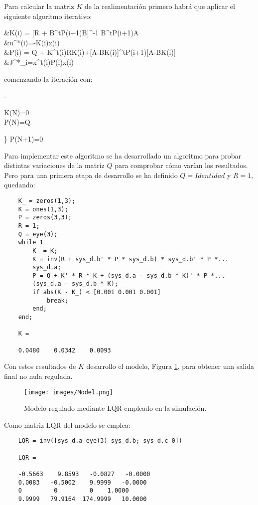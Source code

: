 \documentclass[a4paper, fontsize=11pt]{scrartcl} %
\numberwithin{equation}{section} %
\numberwithin{figure}{section} %
\numberwithin{table}{section} %
\newenvironment{myalign}{\par\nobreak\large\noindent\align}{\endalign} %
\begin{document}
	Para calcular la matriz $K$ de la realimentación primero habrá que aplicar el siguiente algoritmo iterativo:
	
	\begin{myalign}
		\begin{split}
			&K(i) = [R + B^tP(i+1)B]^{-1} B^tP(i+1)A\\
			&u^*(i)=-K(i)x(i)\\
			&P(i) = Q + K^t(i)RK(i)+[A-BK(i)]^tP(i+1)[A-BK(i)]\\
			&J^*_i=x^t(i)P(i)x(i)
		\end{split}	
	\end{myalign}
	comenzando la iteración con:
	
	\begin{myalign}
		\left . 
		\begin{matrix} 
			K(N)=0 \\
			P(N)=Q
		\end{matrix}
		\right \}
		\Longleftrightarrow P(N+1)=0
	\end{myalign}
	
	Para implementar este algoritmo se ha desarrollado un algoritmo para probar distintas variaciones de la matriz $Q$ para comprobar cómo varían los resultados. Pero para una primera etapa de desarrollo se ha definido $Q = Identidad$ y $R = 1$, quedando:
	
	\begin{lstlisting}
	K_ = zeros(1,3);
	K = ones(1,3);
	P = zeros(3,3);
	R = 1;
	Q = eye(3);
	while 1
		K_ = K;
		K = inv(R + sys_d.b' * P * sys_d.b) * sys_d.b' * P *...
		sys_d.a;
		P = Q + K' * R * K + (sys_d.a - sys_d.b * K)' * P *...
		(sys_d.a - sys_d.b * K);
		if abs(K - K_) < [0.001 0.001 0.001]
			break;
		end;
	end;
	
	K =
	
	0.0480    0.0342    0.0093
	\end{lstlisting}
	
	Con estos resultados de $K$ desarrollo el modelo, Figura \ref{Model}, para obtener una salida final no nula regulada.
	
	\begin{figure}[h!]
		\centering
		\texttt{[image: images/Model.png]}
		\caption{Modelo regulado mediante LQR empleado en la simulación.}
		\label{Model}
	\end{figure}
	\FloatBarrier
	Como matriz LQR del modelo se emplea:
	
	\begin{lstlisting}
	LQR = inv([sys_d.a-eye(3) sys_d.b; sys_d.c 0])
	
	LQR =
	
	-0.5663    9.8593   -0.0827   -0.0000
	0.0083   -0.5002    9.9999   -0.0000
	0         0         0    1.0000
	9.9999   79.9164  174.9999   10.0000
	\end{lstlisting}
	
\end{document}
